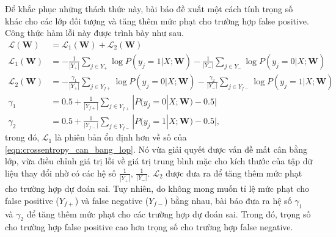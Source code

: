 	Để khắc phục những thách thức này, bài báo đề xuất một cách tính trọng số khác cho các lớp đối tượng và tăng thêm mức phạt cho trường hợp false positive. Công thức hàm lỗi này được trình bày như sau.
	\begin{align}
		\mathcal{L}(\mathbf{W}) &= \mathcal{L}_1(\mathbf{W}) + \mathcal{L}_2(\mathbf{W}) \label{eqn:crossentropy_fpcorrection} \\ 
		\mathcal{L}_1(\mathbf{W}) &= -\frac{1}{|Y_+|}\sum_{j\in Y_+}\log P(y_j = 1|X; \mathbf{W}) - \frac{1}{|Y_-|}\sum_{j\in Y_-}\log P(y_j = 0|X; \mathbf{W}) \nonumber \\
		\mathcal{L}_2(\mathbf{W}) &= -\frac{\gamma_1}{|Y_+|}\sum_{j\in Y_{f+}}\log P(y_j = 0|X; \mathbf{W}) - \frac{\gamma_2}{|Y_-|}\sum_{j\in Y_{f-}}\log P(y_j = 1|X; \mathbf{W}) \nonumber \\
		\gamma_1 &= 0.5 + \frac{1}{|Y_{f+}|}\sum_{j\in Y_{f+}}|P(y_j = 0|X; \mathbf{W}) - 0.5| \nonumber \\
		\gamma_2 &= 0.5 + \frac{1}{|Y_{f-}|}\sum_{j\in Y_{f-}}|P(y_j = 1|X; \mathbf{W}) - 0.5|, \nonumber
	\end{align}
	trong đó, $\mathcal{L}_1$ là phiên bản ổn định hơn về số của \autoref{eqn:crossentropy_can_bang_lop}. Nó vừa giải quyết được vấn đề mất cân bằng lớp, vừa điều chỉnh giá trị lỗi về giá trị trung bình mặc cho kích thước của tập dữ liệu thay đổi nhờ có các hệ số $\frac{1}{|Y_+|}$, $\frac{1}{|Y_-|}$. $\mathcal{L}_2$ được đưa ra để tăng thêm mức phạt cho trường hợp dự đoán sai. Tuy nhiên, do không mong muốn tỉ lệ mức phạt cho false positive ($Y_{f+}$) và false negative ($Y_{f-}$) bằng nhau, bài báo đưa ra hệ số $\gamma_1$ và $\gamma_2$ để tăng thêm mức phạt cho các trường hợp dự đoán sai. Trong đó, trọng số cho trường hợp false positive cao hơn trọng số cho trường hợp false negative.
